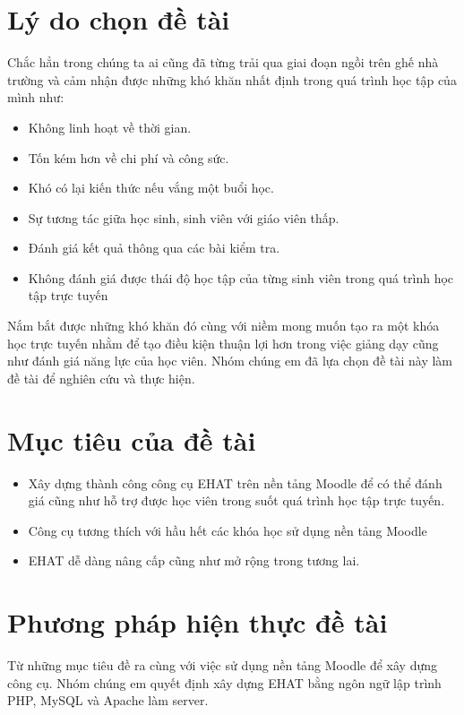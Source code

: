 \section{Lý do chọn đề tài}
Chắc hẳn trong chúng ta ai cũng đã từng trải qua giai đoạn ngồi trên ghế nhà trường và cảm nhận được những khó khăn nhất định trong quá trình học tập của mình như:
\begin{itemize}
	\item Không linh hoạt về thời gian.
	\item Tốn kém hơn về chi phí và công sức.
	\item Khó có lại kiến thức nếu vắng một buổi học.
	\item Sự tương tác giữa học sinh, sinh viên với giáo viên thấp.
	\item Đánh giá kết quả thông qua các bài kiểm tra.
	\item Không đánh giá được thái độ học tập của từng sinh viên trong quá trình học tập trực tuyến
\end{itemize}
Nắm bắt được những khó khăn đó cùng với niềm mong muốn tạo ra một khóa học trực tuyến nhằm để tạo điều kiện thuận lợi hơn trong việc giảng dạy cũng như đánh giá năng lực của học viên. Nhóm chúng em đã lựa chọn đề tài này làm đề tài để nghiên cứu và thực hiện.

\section{Mục tiêu của đề tài}
\begin{itemize}
	\item Xây dựng thành công công cụ EHAT trên nền tảng Moodle để có thể đánh giá cũng như hỗ trợ được học viên trong suốt quá trình học tập trực tuyến.
	\item Công cụ tương thích với hầu hết các khóa học sử dụng nền tảng Moodle
	\item EHAT dễ dàng nâng cấp cũng như mở rộng trong tương lai.
\end{itemize}

\section{Phương pháp hiện thực đề tài}
Từ những mục tiêu đề ra cùng với việc sử dụng nền tảng Moodle để xây dựng công cụ. Nhóm chúng em quyết định xây dựng EHAT bằng ngôn ngữ lập trình PHP, MySQL và Apache làm server.